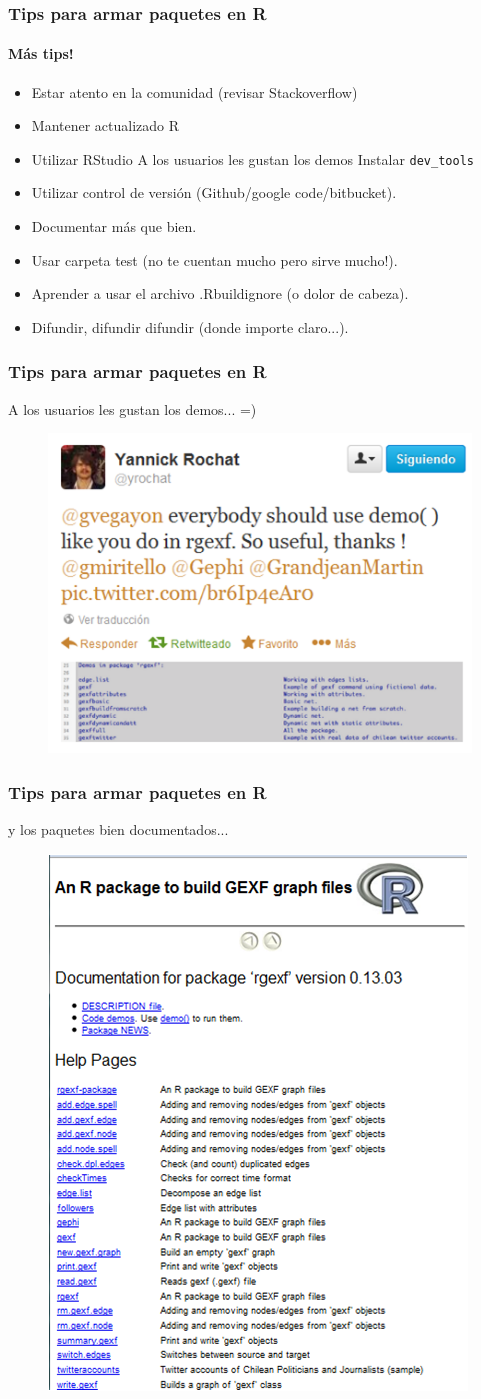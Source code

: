 \documentclass{beamer}\usepackage{graphicx, color}
\begin{document}
\begin{frame}
\frametitle{Tips para armar paquetes en R}
\framesubtitle{M\'as tips!}
\begin{itemize}[<+->]
\item Estar atento en la comunidad (revisar Stackoverflow)
\item Mantener actualizado R
\item Utilizar RStudio
A los usuarios les gustan los demos
Instalar {\tt dev\_tools}
\item Utilizar control de versi\'on (Github/google code/bitbucket).
\item Documentar m\'as que bien.
\item Usar carpeta test (no te cuentan mucho pero sirve mucho!).
\item Aprender a usar el archivo .Rbuildignore (o dolor de cabeza).
\item Difundir, difundir difundir (donde importe claro...).
\end{itemize}
\end{frame}

\begin{frame}
\frametitle{Tips para armar paquetes en R}
A los usuarios les gustan los demos... =)
\begin{figure}
\centering
\includegraphics[height=.5\linewidth]{yrochat}
\end{figure}
\end{frame}

\begin{frame}
\frametitle{Tips para armar paquetes en R}
y los paquetes bien documentados...
\begin{figure}
\centering
\includegraphics[height=.5\linewidth]{rgexfman}
\end{figure}
\end{frame}
\end{document}
